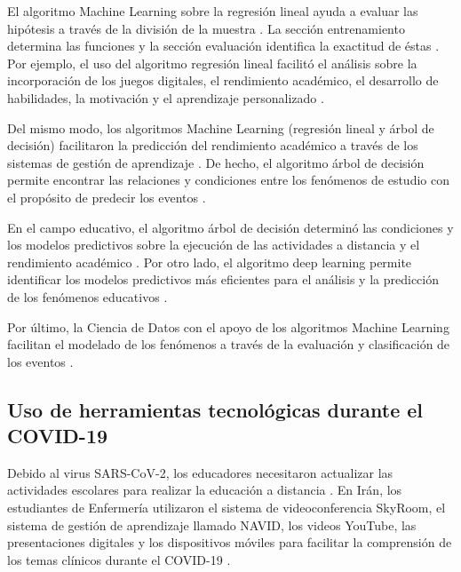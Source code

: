 \documentclass[spanish]{textolivre}
\begin{document}
El algoritmo Machine Learning sobre la regresión lineal ayuda a evaluar las hipótesis a través de la división de la muestra \cite{alenezi_utilizing_2020, chadaga_battling_2021, khakpour_convergence_2021}. La sección entrenamiento determina las funciones y la sección evaluación identifica la exactitud de éstas \cite{khakpour_convergence_2021}. Por ejemplo, el uso del algoritmo regresión lineal facilitó el análisis sobre la incorporación de los juegos digitales, el rendimiento académico, el desarrollo de habilidades, la motivación y el aprendizaje personalizado \cite{khakpour_convergence_2021}.

Del mismo modo, los algoritmos Machine Learning (regresión lineal y árbol de decisión) facilitaron la predicción del rendimiento académico a través de los sistemas de gestión de aprendizaje \cite{koyuncu_classification_2022}. De hecho, el algoritmo árbol de decisión permite encontrar las relaciones y condiciones entre los fenómenos de estudio con el propósito de predecir los eventos \cite{alenezi_utilizing_2020, chadaga_battling_2021, skrbinjek_predicting_2019}.

En el campo educativo, el algoritmo árbol de decisión determinó las condiciones y los modelos predictivos sobre la ejecución de las actividades a distancia y el rendimiento académico \cite{skrbinjek_predicting_2019}. Por otro lado, el algoritmo deep learning permite identificar los modelos predictivos más eficientes para el análisis y la predicción de los fenómenos educativos \cite{doleck_predictive_2020}.

Por último, la Ciencia de Datos con el apoyo de los algoritmos Machine Learning facilitan el modelado de los fenómenos a través de la evaluación y clasificación de los eventos \cite{alenezi_utilizing_2020, chadaga_battling_2021, khanal_systematic_2020}.


\subsection{Uso de herramientas tecnológicas durante el COVID-19}
Debido al virus SARS-CoV-2, los educadores necesitaron actualizar las actividades escolares para realizar la educación a distancia \cite{farsi_investigating_2022, stevanus_impact_2022}. En Irán, los estudiantes de Enfermería utilizaron el sistema de videoconferencia SkyRoom, el sistema de gestión de aprendizaje llamado NAVID, los videos YouTube, las presentaciones digitales y los dispositivos móviles para facilitar la comprensión de los temas clínicos durante el COVID-19 \cite{farsi_investigating_2022}.
\end{document}
